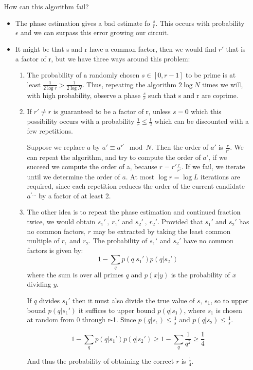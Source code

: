 How can this algorithm fail?
\begin{itemize}
    \item The phase estimation gives a bad estimate fo $\frac{s}{r}$. This occurs with probability $\epsilon$ and we can surpass this error growing our circuit.
    \item It might be that s and r have a common factor, then we would find $r'$ that is a factor of r, but we have three ways around this problem:
    \begin{enumerate}
        \item The probability of a randomly chosen $s \in [0, r-1]$ to be prime is at least $\frac{1}{2 \log r} > \frac{1}{2 \log N}$. Thus, repeating the algorithm $2 \log N$ times we will, with high probability, observe a phase $\frac{s}{r}$ such that s and r are coprime.
        \item If $r' \neq r$ is guaranteed to be a factor of r, unless $s=0$ which this possibility occurs with a probability $\frac{1}{r} \leq \frac{1}{2}$ which can be discounted with a few repetitions.
        
        Suppose we replace $a$ by $a' \equiv a^{r'} \mod N$. Then the order of $a'$ is $\frac{r}{r'}$. We can repeat the algorithm, and try to compute the order of $a'$, if we succeed we compute the order of a, because $r = r' \frac{r}{r'}$. If we fail, we iterate until we determine the order of $a$. At most $\log r = \log L$ iterations are required, since each repetition reduces the order of the current candidate $a^{'\dots}$ by a factor of at least 2.
        
        \item The other idea is to repeat the phase estimation and continued fraction twice, we would obtain $s_1' \ , \ r_1'$ and $s_2' \ , \ r_2'$. Provided that $s_1'$ and $s_2'$ has no common factors, $r$ may be extracted by taking the least common multiple of $r_1$ and $r_2$. The probability of $s_1'$ and $s_2'$ have no common factors is given by:
        \begin{equation*}
            1 - \sum_q p(q | s_1') p(q| s_2')
        \end{equation*}
        where the sum is over all primes $q$ and $p(x|y)$ is the probability of $x$ dividing $y$.
        
        If $q$ divides $s_1'$ then it must also divide the true value of $s$, $s_1$, so to upper bound $p(q|s_1')$ it suffices to upper bound $p(q | s_1)$, where $s_1$ is chosen at random from 0 through r-1. Since $p(q|s_1) \leq \frac{1}{s}$ and $p(q|s_2) \leq \frac{1}{s}$.
        
        \begin{equation*}
            1 - \sum_q p(q|s_1') p(q|s_2') \geq 1 - \sum_q \frac{1}{q^2} \geq \frac{1}{4}
        \end{equation*}
        
        And thus the probability of obtaining the correct $r$ is $\frac{1}{4}$.
    \end{enumerate}
\end{itemize}